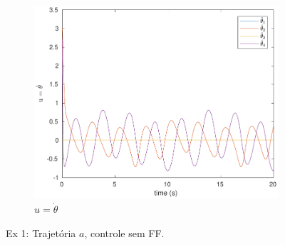 \documentclass[a4paper,11pt]{article}
\theoremstyle{mytheor}
\begin{document}
\begin{figure}[!ht]
\begin{minipage}{\linewidth}
\begin{subfigure}[b]{0.45\textwidth}
    \end{subfigure}
    \begin{subfigure}[b]{0.45\textwidth}
    \includegraphics[width=1\textwidth]{figs/ex1_a_2_dq.pdf}
    \caption{$u = \dot{\theta}$}
    \label{fig:ex1_a_2_dq}
    \end{subfigure}
  \end{minipage}
\caption{Ex 1: Trajetória $a$, controle sem FF.}
\label{fig:ex1_a_2}
\end{figure}
\end{document}
